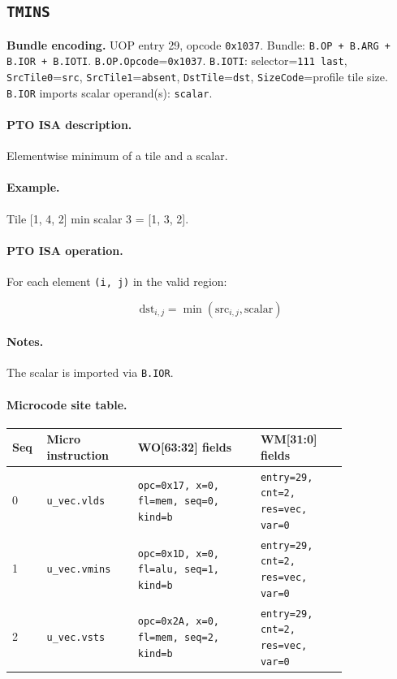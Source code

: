 \subsection{\texttt{TMINS}}
\noindent\textbf{Bundle encoding.} UOP entry 29, opcode \texttt{0x1037}. Bundle: \texttt{B.OP + B.ARG + B.IOR + B.IOTI}. \texttt{B.OP.Opcode}=\texttt{0x1037}. \texttt{B.IOTI}: selector=\texttt{111 last}, \texttt{SrcTile0}=\texttt{src}, \texttt{SrcTile1}=\texttt{absent}, \texttt{DstTile}=\texttt{dst}, \texttt{SizeCode}=profile tile size. \texttt{B.IOR} imports scalar operand(s): \texttt{scalar}.\par\smallskip
{\small
\paragraph{PTO ISA description.}
Elementwise minimum of a tile and a scalar.
\paragraph{Example.}
Tile [1, 4, 2] min scalar 3 = [1, 3, 2].
\par\smallskip
\paragraph{PTO ISA operation.}
For each element \texttt{(i, j)} in the valid region:

\[
\mathrm{dst}_{i,j} = \min(\mathrm{src}_{i,j}, \mathrm{scalar})
\]
}\par\smallskip
\paragraph{Notes.}
The scalar is imported via \texttt{B.IOR}.
\paragraph{Microcode site table.}
{\scriptsize
\begin{longtable}{@{}R{0.055\linewidth}L{0.23\linewidth}L{0.31\linewidth}L{0.22\linewidth}@{}}
\toprule
Seq & Micro instruction & WO[63:32] fields & WM[31:0] fields \\
 & \texttt{u\_vec.vlds} & \texttt{opc=0x17, x=0, fl=mem, seq=0, kind=b} & \texttt{entry=29, cnt=2, res=vec, var=0} \\
1 & \texttt{u\_vec.vmins} & \texttt{opc=0x1D, x=0, fl=alu, seq=1, kind=b} & \texttt{entry=29, cnt=2, res=vec, var=0} \\
2 & \texttt{u\_vec.vsts} & \texttt{opc=0x2A, x=0, fl=mem, seq=2, kind=b} & \texttt{entry=29, cnt=2, res=vec, var=0} \\
\bottomrule
\end{longtable}
}
